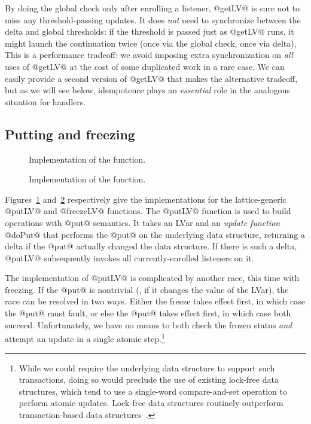 By doing the global check only after enrolling a listener, @getLV@ is
sure not to miss any threshold-passing updates.  It does \emph{not}
need to synchronize between the delta and global thresholds: if the
threshold is passed just as @getLV@ runs, it might launch the
continuation twice (once via the global check, once via delta),   This is a performance tradeoff: we
avoid imposing extra synchronization on \emph{all} uses of @getLV@ at
the cost of some duplicated work in a rare case.  We can easily
provide a second version of @getLV@ that makes the alternative
tradeoff, but as we will see below, idempotence plays an
\emph{essential} role in the analogous situation for handlers.

\subsection{Putting and freezing}


\begin{figure}
  \singlespacing
  
  \doublespacing
  \caption{Implementation of the 
    function.}\label{fig:implementation-putLV}
\end{figure}

\begin{figure}
  \singlespacing
  
  \doublespacing
  \caption{Implementation of the 
    function.}\label{fig:implementation-freezeLV}
\end{figure}

Figures~\ref{fig:implementation-putLV}
and~\ref{fig:implementation-freezeLV} respectively give the
implementations for the lattice-generic @putLV@ and @freezeLV@
functions.  The @putLV@ function is used to build operations with
@put@ semantics.  It takes an LVar and an \emph{update function}
@doPut@ that performs the @put@ on the underlying data structure,
returning a delta if the @put@ actually changed the data structure.
If there is such a delta, @putLV@ subsequently invokes all
currently-enrolled listeners on it.

The implementation of @putLV@ is complicated by another race, this
time with freezing.  If the @put@ is nontrivial (\ie, if it changes
the value of the LVar), the race can be resolved in two ways.  Either
the freeze takes effect first, in which case the @put@ must fault, or
else the @put@ takes effect first, in which case both succeed.
Unfortunately, we have no means to both check the frozen status
\emph{and} attempt an update in a single atomic step.\footnote{While
  we could require the underlying data structure to support such
  transactions, doing so would preclude the use of existing lock-free
  data structures, which tend to use a single-word compare-and-set
  operation to perform atomic updates.  Lock-free data structures
  routinely outperform transaction-based data
  structures~\cite{practical-lock-freedom}.}

